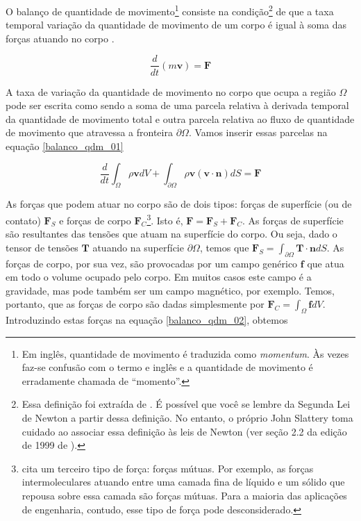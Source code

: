\documentclass[a4paper,portuguese,10pt]{article}
\renewcommand{\D}{\partial}
\renewcommand{\vec}{\mathbf}
\begin{document}
O balanço de quantidade de movimento\footnote{Em inglês, quantidade de movimento é traduzida como {\it momentum}. Às vezes faz-se confusão com o termo e inglês e a quantidade de movimento é erradamente chamada de ``momento''.} consiste na condição\footnote{Essa definição foi extraída de \citet{SLATTERY99}. É possível que você se lembre da Segunda Lei de Newton a partir dessa definição. No entanto, o próprio John Slattery toma cuidado ao associar essa definição às leis de Newton (ver seção 2.2 da edição de 1999 de \cite{SLATTERY99}).} de que a taxa temporal variação da quantidade de movimento de um corpo é igual à soma das forças atuando no corpo \cite{SLATTERY99}.

\begin{equation}
  \frac{d}{dt}(m\vec{v}) = \vec{F}
  \label{balanco_qdm_01}
\end{equation}

A taxa de variação da quantidade de movimento no corpo que ocupa a região $\Omega$ pode ser escrita como sendo a soma de uma parcela relativa à derivada temporal da quantidade de movimento total e outra parcela relativa ao fluxo de quantidade de movimento que atravessa a fronteira $\D\Omega$. Vamos inserir essas parcelas na equação \ref{balanco_qdm_01}

\begin{equation}
  \frac{d}{dt}\int_{\Omega}\rho\vec{v}dV + \int_{\D\Omega}\rho\vec{v}(\vec{v}\cdot\vec{n})dS = \vec{F}
  \label{balanco_qdm_02}
\end{equation}

As forças que podem atuar no corpo são de dois tipos: forças de superfície (ou de contato) $\vec{F}_S$ e forças de corpo $\vec{F}_C$\footnote{\citet{SLATTERY99} cita um terceiro tipo de força: forças mútuas. Por exemplo, as forças intermoleculares atuando entre uma camada fina de líquido e um sólido que repousa sobre essa camada são forças mútuas. Para a maioria das aplicações de engenharia, contudo, esse tipo de força pode desconsiderado.}. Isto é, $\vec{F} = \vec{F}_S + \vec{F}_C $. As forças de superfície são resultantes das tensões que atuam na superfície do corpo. Ou seja, dado o tensor de tensões $\vec{T}$ atuando na superfície $\D\Omega$, temos que $\vec{F}_S = \int_{\D\Omega}\vec{T}\cdot\vec{n}dS$. As forças de corpo, por sua vez, são provocadas por um campo genérico $\vec{f}$ que atua em todo o volume ocupado pelo corpo. Em muitos casos este campo é a gravidade, mas pode também ser um campo magnético, por exemplo. Temos, portanto, que as forças de corpo são dadas simplesmente por $\vec{F}_C = \int_{\Omega}\vec{f}dV$. Introduzindo estas forças na equação \ref{balanco_qdm_02}, obtemos
\end{document}
